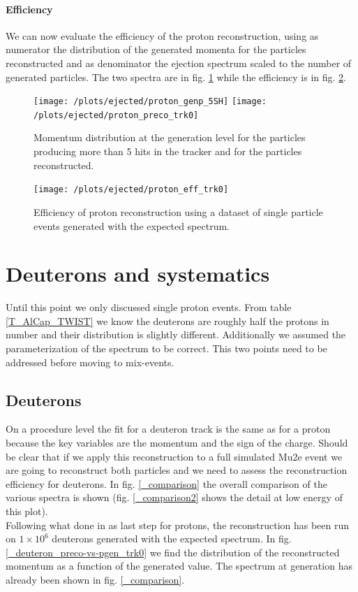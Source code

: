 \documentclass[12pt,a4paper,openright, oneside, titlepage]{book} %
\begin{document}
\paragraph{Efficiency} We can now evaluate the efficiency of the proton reconstruction, using as numerator the distribution of the generated momenta for the particles reconstructed and as denominator the ejection spectrum scaled to the number of generated particles. The two spectra are in fig. \ref{_proton_momenta} while the efficiency is in fig. \ref{_proton_eff_trk0}.

\begin{figure}[h!]
\centering
\texttt{[image: /plots/ejected/proton\_genp\_5SH]}\hfill
\texttt{[image: /plots/ejected/proton\_preco\_trk0]}
\caption{Momentum distribution at the generation level for the particles producing more than 5 hits in the tracker and for the particles reconstructed.}
\label{_proton_momenta}
\end{figure}


\begin{figure}[!htb]
\centering
\texttt{[image: /plots/ejected/proton\_eff\_trk0]}
\caption{Efficiency of proton reconstruction using a dataset of single particle events generated with the expected spectrum.}
\label{_proton_eff_trk0}
\end{figure}

\section{Deuterons and systematics}
Until this point we only discussed single proton events. 
From table \ref{T_AlCap_TWIST} we know the deuterons are roughly half the protons in number and their distribution is slightly different.
Additionally we assumed the parameterization of the spectrum to be correct. This two points need to be addressed before moving to mix-events.

\subsection{Deuterons}
On a procedure level the fit for a deuteron track is the same as for a proton because the key variables are the momentum and the sign of the charge.
Should be clear that if we apply this reconstruction to a full simulated Mu2e event we are going to reconstruct both particles and we need to assess the reconstruction efficiency for deuterons. 
In fig. \ref{_comparison} the overall comparison of the various spectra is shown (fig. \ref{_comparison2} shows the detail at low energy of this plot).\\
Following what done in as last step for protons, the reconstruction has been run on $1 \times 10^6$ deuterons generated with the expected spectrum. 
In fig. \ref{_deuteron_preco-vs-pgen_trk0} we find the distribution of the reconstructed momentum as a function of the generated value. The spectrum at generation has already been shown in fig. \ref{_comparison}. 
\end{document}

